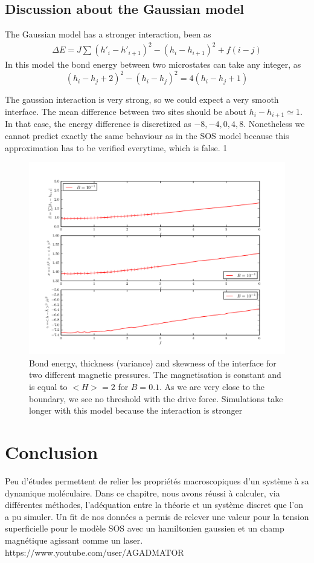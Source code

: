 	\subsection{Discussion about the Gaussian model}
	
The Gaussian model has a stronger interaction, been as
\begin{align}
	\Delta E = J \sum (h'_i-h'_{i+1})^2 -(h_i-h_{i+1})^2+ f (i-j)
\end{align}
In this model the bond energy between two microstates can take any integer, as 
\begin{equation*}
	(h_i-h_j+2)^2 - (h_i-h_j)^2 = 4 (h_i-h_j+1)
\end{equation*}

The gaussian interaction is very strong, so we could expect a very smooth interface. The mean difference between two sites should be about $h_i-h_{i+1} \simeq 1$. In that case, the energy difference is discretized as ${-8,-4,0,4,8}$. 
Nonetheless we cannot predict exactly the same behaviour as in the SOS model because this approximation has to be verified everytime, which is false. 1

\begin{figure}
	\includegraphics[width=\linewidth]{./sosequi-laser/gauss0.pdf}
	\caption{Bond energy, thickness (variance) and skewness of the interface for two different magnetic pressures. The magnetisation is constant and is equal to $<H>=2$ for $B=0.1$. As we are very close to the boundary, we see no threshold with the drive force. Simulations take longer with this model because the interaction is stronger}
\end{figure}


    \section{Conclusion}

Peu d'études permettent de relier les propriétés macroscopiques d'un système à sa dynamique moléculaire. Dans ce chapitre, nous avons réussi à calculer, via différentes méthodes, l'adéquation entre la théorie et un système discret que l'on a pu simuler. Un fit de nos données a permis de relever une valeur pour la tension superficielle pour le modèle SOS avec un hamiltonien gaussien et un champ magnétique agissant comme un laser. https://www.youtube.com/user/AGADMATOR
